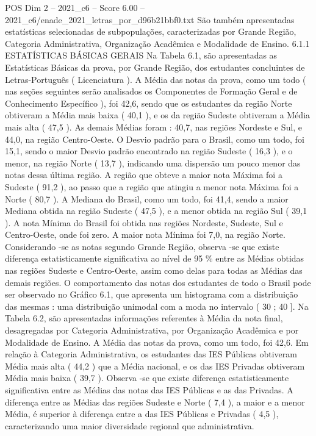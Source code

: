\begin{textsample}{POS Dim 2 – 2021\_c6 – Score 6.00 – 2021\_c6/enade\_2021\_letras\_por\_d96b21bbf0.txt}
São também apresentadas estatísticas selecionadas de subpopulações, caracterizadas por Grande Região, Categoria Administrativa, Organização Acadêmica e Modalidade de Ensino. 6.1.1 ESTATÍSTICAS BÁSICAS GERAIS Na Tabela 6.1, são apresentadas as Estatísticas Básicas da prova, por Grande Região, dos estudantes concluintes de Letras-Português ( Licenciatura ).
A Média das notas da prova, como um todo ( nas seções seguintes serão analisados os Componentes de Formação Geral e de Conhecimento Específico ), foi 42,6, sendo que os estudantes da região Norte obtiveram a Média mais baixa ( 40,1 ), e os da região Sudeste obtiveram a Média mais alta ( 47,5 ).
As demais Médias foram : 40,7, nas regiões Nordeste e Sul, e 44,0, na região Centro-Oeste.
O Desvio padrão para o Brasil, como um todo, foi 15,1, sendo o maior Desvio padrão encontrado na região Sudeste ( 16,3 ), e o menor, na região Norte ( 13,7 ), indicando uma dispersão um pouco menor das notas dessa última região.
A região que obteve a maior nota Máxima foi a Sudeste ( 91,2 ), ao passo que a região que atingiu a menor nota Máxima foi a Norte ( 80,7 ).
A Mediana do Brasil, como um todo, foi 41,4, sendo a maior Mediana obtida na região Sudeste ( 47,5 ), e a menor obtida na região Sul ( 39,1 ).
A nota Mínima do Brasil foi obtida nas regiões Nordeste, Sudeste, Sul e Centro-Oeste, onde foi zero.
A maior nota Mínima foi 7,0, na região Norte.
Considerando -se as notas segundo Grande Região, observa -se que existe diferença estatisticamente significativa ao nível de 95 \% entre as Médias obtidas nas regiões Sudeste e Centro-Oeste, assim como delas para todas as Médias das demais regiões.
O comportamento das notas dos estudantes de todo o Brasil pode ser observado no Gráfico 6.1, que apresenta um histograma com a distribuição das mesmas : uma distribuição unimodal com a moda no intervalo ( 30 ; 40 ].
Na Tabela 6.2, são apresentadas informações referentes à Média da nota final, desagregadas por Categoria Administrativa, por Organização Acadêmica e por Modalidade de Ensino.
A Média das notas da prova, como um todo, foi 42,6.
Em relação à Categoria Administrativa, os estudantes das IES Públicas obtiveram Média mais alta ( 44,2 ) que a Média nacional, e os das IES Privadas obtiveram Média mais baixa ( 39,7 ).
Observa -se que existe diferença estatisticamente significativa entre as Médias das notas das IES Públicas e as das Privadas.
A diferença entre as Médias das regiões Sudeste e Norte ( 7,4 ), a maior e a menor Média, é superior à diferença entre a das IES Públicas e Privadas ( 4,5 ), caracterizando uma maior diversidade regional que administrativa.

\end{textsample}
